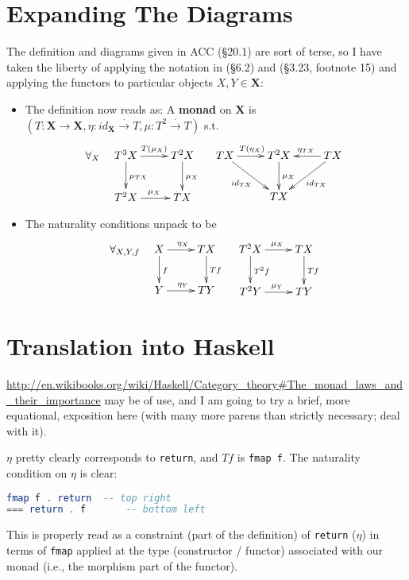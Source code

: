\documentclass[10pt,letterpaper]{article}
\newcommand{\defn}[1]{{\bf #1}}
\newcommand{\natto}{\overset{\cdot}{\to}}
\begin{document}
\section{Expanding The Diagrams}

The definition and diagrams given in ACC (\S20.1) are sort of terse, so I
have taken the liberty of applying the notation in (\S6.2) and (\S3.23,
footnote 15) and applying the functors to particular objects $X,Y \in
\mathbf{X}$:
\begin{itemize}
  \item The definition now reads as: A \defn{monad} on $\mathbf{X}$ is $(T : \mathbf{X} \to \mathbf{X},
  \eta : id_{\mathbf{X}} \natto T, \mu : T^2 \natto T)$ s.t.
  \[\forall_X \quad
  \xymatrix{
    T^3X \ar[r]^{T(\mu_X)} \ar[d]^{\mu_{TX}} & T^2X \ar[d]^{\mu_{X}} \\
    T^2X \ar[r]^{\mu_X}                 & TX
  } \quad \xymatrix{
    TX \ar[r]^{T(\eta_X)} \ar[dr]_{id_{TX}} & T^2X \ar[d]^{\mu_X} & TX \ar[l]_{\eta_{TX}} \ar[dl]^{id_{TX}} \\
        & TX & 
  }\]
  \item The naturality conditions unpack to be
  \[\forall_{X,Y,f} \quad \xymatrix{
    X \ar[r]^{\eta_X} \ar[d]^f & TX \ar[d]^{Tf} \\
    Y \ar[r]^{\eta_Y}          & TY
  }\quad\xymatrix{
    T^2X \ar[r]^{\mu_X} \ar[d]^{T^2f} & TX \ar[d]^{Tf} \\
    T^2Y \ar[r]^{\mu_Y}               & TY
  }\]
\end{itemize}

\section{Translation into Haskell}

\url{http://en.wikibooks.org/wiki/Haskell/Category_theory#The_monad_laws_and_their_importance}
may be of use, and I am going to try a brief, more equational, exposition
here (with many more parens than strictly necessary; deal with it).

$\eta$ pretty clearly corresponds to \texttt{return}, and $Tf$ is
\texttt{fmap f}.  The naturality condition on $\eta$ is clear:
\begin{lstlisting}[language=Haskell]
    fmap f . return  -- top right
=== return . f       -- bottom left
\end{lstlisting}
This is properly read as a constraint (part of the definition) of
\texttt{return} ($\eta$) in terms of \texttt{fmap} applied at the type
(constructor / functor) associated with our monad (i.e., the morphism part
of the functor).
\end{document}
